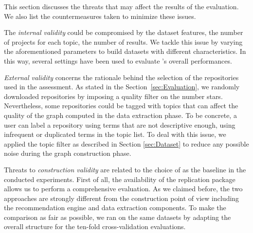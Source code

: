 
This section discusses the threats that may affect the results of the evaluation. We also list the countermeasures taken to minimize these issues.

The \emph{internal validity} could be compromised by the dataset features, \ie the number of projects for each topic, the number of results. We tackle this issue by varying the aforementioned parameters to build datasets with different characteristics. In this way, several settings have been used to evaluate \TF's overall performances.

\emph{External validity} concerns the rationale behind the selection of the \GH 
repositories used in the assessment. As stated in the 
Section~\ref{sec:Evaluation}, we randomly downloaded repositories by imposing a 
quality filter on the number stars. Nevertheless, some repositories could be 
tagged with topics that can affect the quality of the graph computed in the 
data extraction phase. To be concrete, a user can label a repository using 
terms that are not descriptive enough, \ie using infrequent or duplicated terms 
in the topic list. To deal with this issue, we applied the topic filter as 
described in Section \ref{sec:Dataset} to reduce any possible noise during the 
graph construction phase.

Threats to \emph{construction validity} are related to the choice of \MNB as the baseline in the conducted experiments. First of all, the availability of the replication package allows us to perform a comprehensive evaluation. %
As we claimed before, the two approaches are strongly different from the construction point of view including the recommendation engine and data extraction components. To make the comparison as fair as possible, we ran \MNB on the same datasets by adapting the overall structure for the ten-fold cross-validation evaluations.